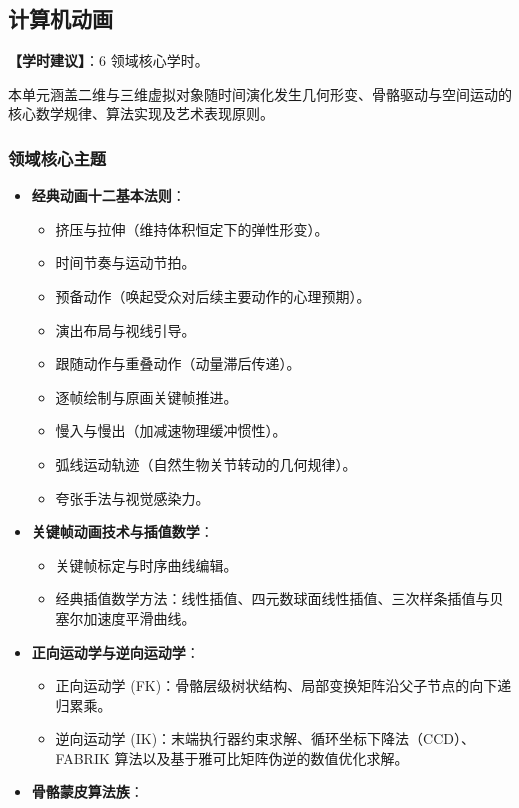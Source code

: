\subsection{计算机动画}
\textbf{【学时建议】}：6 领域核心学时。

本单元涵盖二维与三维虚拟对象随时间演化发生几何形变、骨骼驱动与空间运动的核心数学规律、算法实现及艺术表现原则。

\subsubsection{领域核心主题}
\begin{itemize}
    \item \textbf{经典动画十二基本法则}：
    \begin{itemize}
        \item 挤压与拉伸（维持体积恒定下的弹性形变）。
        \item 时间节奏与运动节拍。
        \item 预备动作（唤起受众对后续主要动作的心理预期）。
        \item 演出布局与视线引导。
        \item 跟随动作与重叠动作（动量滞后传递）。
        \item 逐帧绘制与原画关键帧推进。
        \item 慢入与慢出（加减速物理缓冲惯性）。
        \item 弧线运动轨迹（自然生物关节转动的几何规律）。
        \item 夸张手法与视觉感染力。
    \end{itemize}
    \item \textbf{关键帧动画技术与插值数学}：
    \begin{itemize}
        \item 关键帧标定与时序曲线编辑。
        \item 经典插值数学方法：线性插值、四元数球面线性插值、三次样条插值与贝塞尔加速度平滑曲线。
    \end{itemize}
    \item \textbf{正向运动学与逆向运动学}：
    \begin{itemize}
        \item 正向运动学 (FK)：骨骼层级树状结构、局部变换矩阵沿父子节点的向下递归累乘。
        \item 逆向运动学 (IK)：末端执行器约束求解、循环坐标下降法（CCD）、FABRIK 算法以及基于雅可比矩阵伪逆的数值优化求解。
    \end{itemize}
    \item \textbf{骨骼蒙皮算法族}：

\end{itemize}
